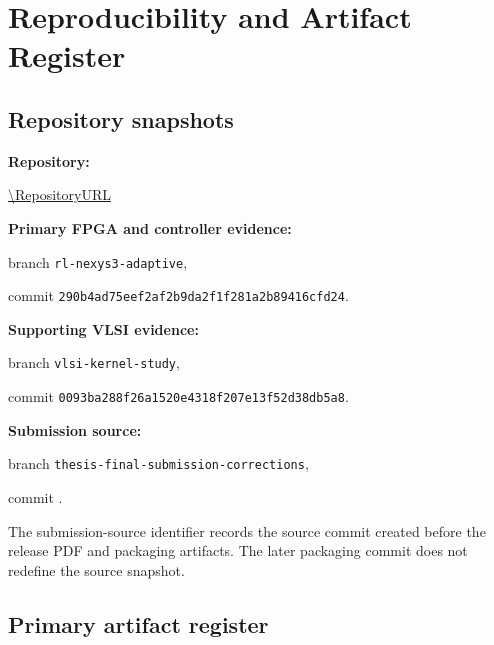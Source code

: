 \chapter{Reproducibility and Artifact Register}
\label{app:reproducibility}

\section{Repository snapshots}

\noindent\textbf{Repository:}\par
\url{\RepositoryURL}

\medskip
\noindent\textbf{Primary FPGA and controller evidence:}\par
branch \texttt{rl-nexys3-adaptive},\par
commit \texttt{290b4ad75eef2af2b9da2f1f281a2b89416cfd24}.

\medskip
\noindent\textbf{Supporting VLSI evidence:}\par
branch \texttt{vlsi-kernel-study},\par
commit \texttt{0093ba288f26a1520e4318f207e13f52d38db5a8}.

\medskip
\noindent\textbf{Submission source:}\par
branch \texttt{thesis-final-submission-corrections},\par
commit \texttt{\FinalThesisSourceCommit}.

\medskip
The submission-source identifier records the source commit created before the
release PDF and packaging artifacts. The later packaging commit does not redefine
the source snapshot.

\section{Primary artifact register}


